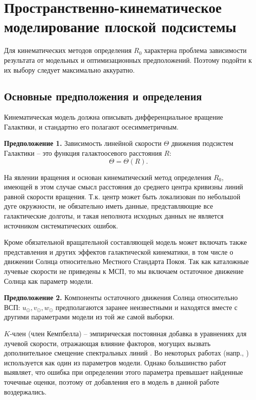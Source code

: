 \documentclass{matmex-diploma-custom}
\begin{document}
\par 
\section{Пространственно-кинематическое моделирование плоской подсистемы}

Для кинематических методов определения $R_0$ характерна проблема зависимости результата от модельных и оптимизационных предположений. Поэтому подойти к их выбору следует максимально аккуратно.
\subsection{Основные предположения и определения}
Кинематическая модель должна описывать дифференциальное вращение Галактики, и стандартно его полагают осесимметричным.

\textbf{Предположение 1.}
Зависимость линейной скорости $\Theta$ движения подсистем Галактики -- это функция галактоосевого расстояния $R$: 
\begin{equation}
        \Theta = \Theta(R).
\end{equation}

На явлении вращения и основан кинематический метод определения $R_0$, имеющей в этом случае смысл расстояния до среднего центра кривизны линий равной скорости вращения. Т.к. центр может быть локализован по небольшой дуге окружности, не обязательно иметь данные, представляющие все галактические долготы, и такая неполнота исходных данных не является источником систематических ошибок.
\par Кроме обязательной вращательной составляющей модель может включать также представления и других эффектов галактической кинематики, в том числе о движении Солнца относительно Местного Стандарта Покоя. Так как каталожные лучевые скорости не приведены к МСП, то мы включаем остаточное движение Солнца как параметр модели. 

\textbf{Предположение 2.}
Компоненты остаточного движения Солнца относительно ВСП: $u_{\odot}, v_{\odot}, w_{\odot}$ предполагаются заранее неизвестными и находятся вместе с другими параметрами модели из той же самой выборки.

\par $K$-член (член Кемпбелла) -- эмпирическая постоянная добавка в уравнениях для лучевой скорости, отражающая влияние факторов, могущих вызвать дополнительное смещение спектральных линий \cite{3}. Во некоторых работах (напр., \cite{28} \cite{29}) используется как один из параметров модели. Однако большинство работ выявляет, что ошибка при определении этого параметра превышает найденные точечные оценки, поэтому от добавления его в модель в данной работе воздержались.
\end{document}
